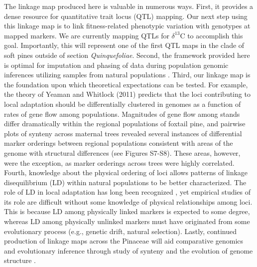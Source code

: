 \documentclass[smallextended]{svjour3}
\begin{document}
The linkage map produced here is valuable in numerous ways. First, it provides a dense resource for
quantitative trait locus (QTL) mapping. Our next step using this linkage map is
to link fitness-related phenotypic variation with genotypes at mapped markers. We are currently mapping
QTLs for $\delta^{13}$C to accomplish this goal. Importantly, this will represent one of the first QTL maps in the
clade of soft pines outside of section \textit{Quinquefoliae}. Second, the framework provided here is optimal for imputation 
and phasing of data during population genomic inferences utilizing samples from natural populations \citep{Scheet:2006}. 
Third, our linkage map is the foundation upon which theoretical expectations can be tested.
For example, the theory of Yeaman and Whitlock (2011) predicts that the loci contributing to local adaptation should
be differentially clustered in genomes as a function of rates of gene flow among populations. Magnitudes of gene flow 
among stands differ dramatically within the regional populations of foxtail pine, and pairwise plots of synteny across maternal trees
revealed several instances of differential marker orderings between regional populations consistent with areas of the genome 
with structural differences (see Figures S7-S8). These areas, however, were the exception, as marker orderings across trees were highly correlated.
Fourth, knowledge about the physical ordering of loci allows patterns of linkage disequilibrium (LD) within natural populations
to be better characterized. The role of LD in local adaptation has long been recognized \citep[see][]{Akerman:2014}, yet empirical studies of its
role are difficult without some knowledge of physical relationships among loci. This is because LD among physically linked
markers is expected to some degree, whereas LD among physically unlinked markers must have originated from some
evolutionary process (e.g., genetic drift, natural selection). Lastly, continued production of linkage maps 
across the Pinaceae will aid comparative genomics and evolutionary inference through study of synteny and the evolution
of genome structure \citep{Ritland:2011}. 
\end{document}
